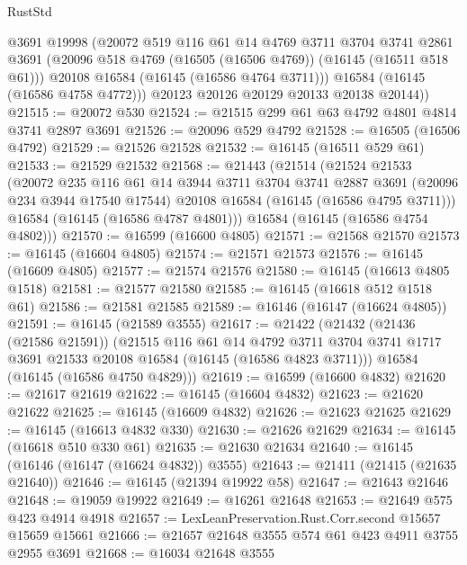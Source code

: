 \begin{lexlean}{RustStd}
\begin{coremodule}
          @3691
          @19998
          (@20072
            @519
            @116
            @61
            @14
            @4769
            @3711
            @3704
            @3741
            @2861
            @3691
            (@20096 @518 @4769 (@16505 (@16506 @4769)) (@16145 (@16511 @518 @61)))
            @20108
            @16584
            (@16145 (@16586 @4764 @3711)))
          @16584
          (@16145 (@16586 @4758 @4772)))
        @20123
        @20126
        @20129
        @20133
        @20138
        @20144))
@21515 := @20072 @530
@21524 := @21515 @299 @61 @63 @4792 @4801 @4814 @3741 @2897 @3691
@21526 := @20096 @529 @4792
@21528 := @16505 (@16506 @4792)
@21529 := @21526 @21528
@21532 := @16145 (@16511 @529 @61)
@21533 := @21529 @21532
@21568 := @21443
    (@21514
      (@21524
        @21533
        (@20072
          @235
          @116
          @61
          @14
          @3944
          @3711
          @3704
          @3741
          @2887
          @3691
          (@20096 @234 @3944 @17540 @17544)
          @20108
          @16584
          (@16145 (@16586 @4795 @3711)))
        @16584
        (@16145 (@16586 @4787 @4801)))
      @16584
      (@16145 (@16586 @4754 @4802)))
@21570 := @16599 (@16600 @4805)
@21571 := @21568 @21570
@21573 := @16145 (@16604 @4805)
@21574 := @21571 @21573
@21576 := @16145 (@16609 @4805)
@21577 := @21574 @21576
@21580 := @16145 (@16613 @4805 @1518)
@21581 := @21577 @21580
@21585 := @16145 (@16618 @512 @1518 @61)
@21586 := @21581 @21585
@21589 := @16146 (@16147 (@16624 @4805))
@21591 := @16145 (@21589 @3555)
@21617 := @21422
    (@21432
      (@21436 (@21586 @21591))
      (@21515
        @116
        @61
        @14
        @4792
        @3711
        @3704
        @3741
        @1717
        @3691
        @21533
        @20108
        @16584
        (@16145 (@16586 @4823 @3711)))
      @16584
      (@16145 (@16586 @4750 @4829)))
@21619 := @16599 (@16600 @4832)
@21620 := @21617 @21619
@21622 := @16145 (@16604 @4832)
@21623 := @21620 @21622
@21625 := @16145 (@16609 @4832)
@21626 := @21623 @21625
@21629 := @16145 (@16613 @4832 @330)
@21630 := @21626 @21629
@21634 := @16145 (@16618 @510 @330 @61)
@21635 := @21630 @21634
@21640 := @16145 (@16146 (@16147 (@16624 @4832)) @3555)
@21643 := @21411 (@21415 (@21635 @21640))
@21646 := @16145 (@21394 @19922 @58)
@21647 := @21643 @21646
@21648 := @19059 @19922
@21649 := @16261 @21648
@21653 := @21649 @575 @423 @4914 @4918
@21657 := LexLeanPreservation.Rust.Corr.second @15657 @15659 @15661
@21666 := @21657 @21648 @3555 @574 @61 @423 @4911 @3755 @2955 @3691
@21668 := @16034 @21648 @3555

\end{coremodule}
\end{lexlean}
